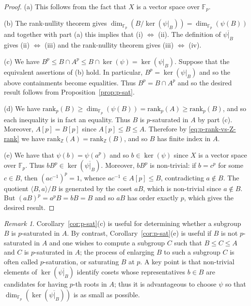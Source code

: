 \documentclass[12pt, a4paper, usenames]{amsart}
\newcommand{\Z}{\mathbb{Z}}
\newcommand{\F}{\mathbb{F}}
\theoremstyle{plain}
\theoremstyle{remark}
\newtheorem{remark}[theorem]{Remark}
\theoremstyle{definition}
\newcommand{\rank}{\mathrm{rank}}
\begin{document}
\begin{proof}
(a) This follows from the fact that $X$ is a vector space over $\F_{p}$.

(b) The rank-nullity theorem gives 
$\dim_{\F_{p}}(B/\ker(\psi|_B)) = \dim_{\F_p}(\psi(B))$
and together with part (a) this implies that 
(i) $\Longleftrightarrow$ (ii).
The definition of $\overline{\psi \vert_{B}}$ gives (ii) 
$\Longleftrightarrow$ (iii) and the rank-nullity theorem gives (iii) 
$\Longleftrightarrow$ (iv).

(c) We have $B^{p} \leq B \cap A^{p} \leq B \cap \ker(\psi) = \ker(\psi\vert_B)$.
Suppose that the equivalent assertions of (b) hold. In particular,
$B^{p} = \ker(\psi \vert_{B})$ and so the above containments become equalities.
Thus $B^{p} = B \cap A^{p}$
and so the desired result follows from Proposition~\ref{prop:p-sat}.

(d) 
We have 
$\rank_{p}(B) \geq \dim_{\F_p}(\psi(B)) 
= \rank_{p}(A) \geq \rank_{p}(B)$, and so each inequality is in fact an equality.
Thus $B$ is $p$-saturated in $A$ by part (c).
Moreover, $A[p]=B[p]$ since $A[p] \leq B \leq A$.
Therefore by \eqref{eq:p-rank-vs-Z-rank} we have 
$\rank_{\Z}(A) =\rank_{\Z}(B)$, and so $B$ has finite index in $A$. 

(e) We have that $\psi(b)=\psi(a^{p})$ and so $b \in \ker(\psi)$ since $X$
is a vector space over $\F_{p}$. 
Thus $bB^{p} \in \ker(\overline{\psi \vert_{B}})$.
Moreover, $bB^{p}$ is non-trivial: if $b=c^{p}$ for some $c \in B$,
then $(ac^{-1})^{p}=1$, whence $ac^{-1} \in A[p] \leq B$, contradicting $a \notin B$.
The quotient $\langle B, a \rangle / B$ is generated by the coset $aB$,
which is non-trivial since $a \notin B$.
But $(aB)^{p}=a^{p}B=bB=B$ and so $aB$ has order exactly $p$, which 
gives the desired result. 
\end{proof}

\begin{remark}
Corollary~\ref{cor:p-sat}(c) is useful for determining whether a subgroup 
$B$ is $p$-saturated in $A$. 
By contrast, Corollary~\ref{cor:p-sat}(e)  is useful if $B$ is not
$p$-saturated in $A$ and one wishes to compute a subgroup $C$ such that $B \leq C \leq A$
and $C$ is $p$-saturated in $A$; the process of enlarging $B$ to such a subgroup $C$
is often called $p$-saturation, or saturating $B$ at $p$.
A key point is that non-trivial elements of $\ker(\overline{\psi \vert_{B}})$ 
identify cosets whose representatives $b \in B$ are candidates for having $p$-th 
roots in $A$; thus it is advantageous to 
choose $\psi$ so that $\dim_{\F_{p}}(\ker(\overline{\psi \vert_{B}}))$ is as small as
possible.
\end{remark}
\end{document}
